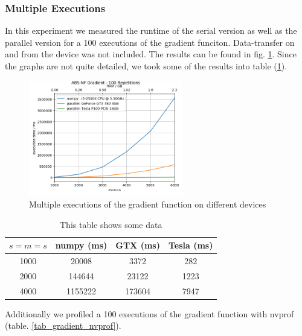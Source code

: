 \subsubsection{Multiple  Executions}
In this experiment we measured the runtime of the serial version as well as the parallel version for a 100 executions of the gradient funciton. Data-transfer on and from the device was not included. The results can be found in fig. \ref{fig_grad_mult_executions}. Since the graphs are not quite detailed, we took some of the results into table (\ref{tab_grad_mult_executions}).
\begin{figure}[ht]
	\centering
	\includegraphics[width=0.6\textwidth]{img/gradient_mult_repetition.png}
	\caption{Multiple executions of the gradient function on different devices}
	\label{fig_grad_mult_executions}
\end{figure}
\begin{table}
	\centering
\begin{tabular}{c|c|c|c}
	$s=m=s$ & numpy (ms) & GTX (ms) & Tesla (ms) \\
	\hline
	1000 & 20008 & 3372 & 282 \\
	2000 & 144644 & 23122 & 1223 \\
	4000 & 1155222 & 173604 & 7947
	
\end{tabular}
\caption{This table shows some data}
\label{tab_grad_mult_executions}
\end{table}

Additionally we profiled a 100 executions of the gradient function with nvprof (table. \ref{tab_gradient_nvprof}).

